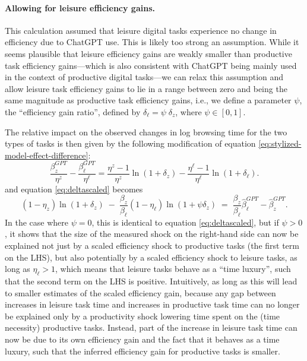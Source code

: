 \documentclass[12pt]{article}
\begin{document}


\paragraph{Allowing for leisure efficiency gains.} This calculation assumed that leisure digital tasks experience no change in efficiency due to ChatGPT use. This is likely too strong an assumption. While it seems plausible that leisure efficiency gains are weakly smaller than productive task efficiency gains---which is also consistent with ChatGPT being mainly used in the context of productive digital tasks---we can relax this assumption and allow leisure task efficiency gains to lie in a range between zero and being the same magnitude as productive task efficiency gains, i.e., we define a parameter $\psi$, the ``efficiency gain ratio'', defined by $\delta_{\ell} = \psi \; \delta_z$, where $\psi \in [0,1]$.

The relative impact on the observed changes in log browsing time for the two types of tasks is then given by the following modification of equation \ref{eq:stylized-model-effect-difference}:
\begin{equation}
\frac{\beta^{GPT}_{z}}{\eta^z} - \frac{\beta^{GPT}_{\ell} }{\eta^{\ell}} = \frac{\eta^z - 1}{\eta^z}  \ln(1+ \delta_z )  - \frac{\eta^{\ell} - 1}{\eta^{\ell}} \ln(1+ \delta_{\ell} ).
\end{equation}
and equation \ref{eq:deltascaled} becomes
\[
(1 - \eta_z)\ln(1 + \delta_z)
\;-\;
\frac{\beta_z}{\beta_\ell} (1 - \eta_\ell)\ln(1 + \psi \delta_z)
\;=\;
 \frac{\beta_z} {\beta_{\ell}}\hat{\beta}^{GPT}_\ell - \hat{\beta}^{GPT}_z.
\]
In the case where $\psi = 0$, this is identical to equation \ref{eq:deltascaled}, but if $\psi>0$, it shows that the size of the measured shock on the right-hand side can now be explained not just by a scaled efficiency shock to productive tasks (the first term on the LHS), but also potentially by a scaled efficiency shock to leisure tasks, as long as $\eta_{\ell}>1$, which means that leisure tasks behave as a ``time luxury'', such that the second term on the LHS is positive. Intuitively, as long as  this will lead to smaller estimates of the scaled efficiency gain, because any gap between increases in leisure task time and increases in productive task time can  no longer  be explained only by a productivity shock lowering time spent on the (time necessity) productive tasks. Instead, part of the increase in leisure task time can now be due to its own efficiency gain and the fact that it behaves as a time luxury, such that the inferred efficiency gain for productive tasks is smaller.
\end{document}

